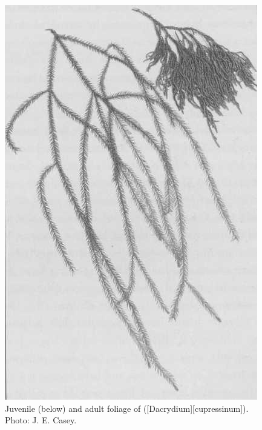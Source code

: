 \begin{figure}[!htb]
	\centering
	\begin{minipage}[t]{0.493\textwidth}
		\centering
		\includegraphics[width=\textwidth]{graphics/figure21rimu.jpg}
    	\caption[Rimu foliage]{Juvenile (below) and adult foliage of  ([Dacrydium][cupressinum]).
    	Photo: J. E. Casey.}%
    	\label{fig:21rimu}
	\end{minipage}\hfill%
	\begin{minipage}[t]{0.487\textwidth}
    	\centering

\end{minipage}
\end{figure}

